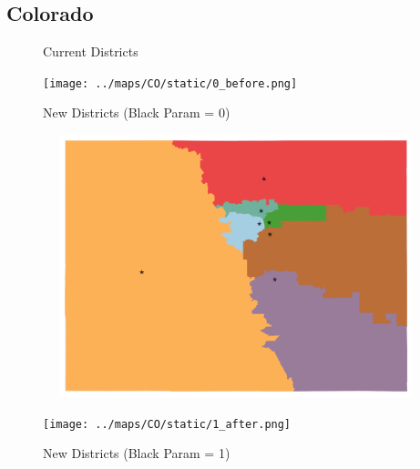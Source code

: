 \subsection{Colorado}
\begin{figure}[htb!] \centering
\caption{ Current Districts }
\texttt{[image: ../maps/CO/static/0\_before.png]}
\caption{ New Districts (Black Param = 0) }
\includegraphics[width=5in,height=3in,keepaspectratio]{../maps/CO/static/0_after.png}
\caption{ New Districts (Black Param = 1) }
\texttt{[image: ../maps/CO/static/1\_after.png]}
\end{figure}

\clearpage
\newpage

